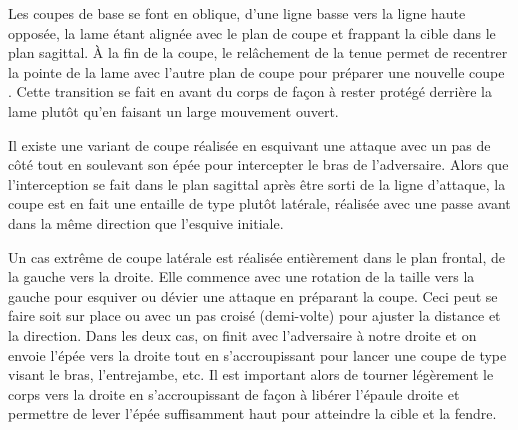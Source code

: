 Les coupes \Liao{} de base se font en oblique, d'une ligne basse vers la ligne haute opposée, la lame étant alignée avec le plan de coupe et frappant la cible dans le plan sagittal. \`{A} la fin de la coupe, le relâchement de la tenue permet de recentrer la pointe de la lame avec l'autre plan de coupe pour préparer une nouvelle coupe \Liao{}. Cette transition se fait en avant du corps de façon à rester protégé derrière la lame plutôt qu'en faisant un large mouvement ouvert.

Il existe une variant de coupe \Liao{} réalisée en esquivant une attaque avec un pas de côté tout en soulevant son épée pour intercepter le bras de l'adversaire. Alors que l'interception se fait dans le plan sagittal après être sorti de la ligne d'attaque, la coupe est en fait une entaille de type \Hua{} plutôt latérale, réalisée avec une passe avant dans la même direction que l'esquive initiale.

Un cas extrême de coupe  \Liao{} latérale est réalisée entièrement dans le plan frontal, de la gauche vers la droite. Elle commence avec une rotation de la taille vers la gauche pour esquiver ou dévier une attaque en préparant la coupe. Ceci peut se faire soit sur place ou avec un pas croisé (demi-volte) pour ajuster la distance et la direction. Dans les deux cas, on finit avec l'adversaire à notre droite et on envoie l'épée vers la droite tout en s'accroupissant pour lancer une coupe\Liao{} de type \Pi{} visant le bras, l'entrejambe, etc. Il est important alors de tourner légèrement le corps vers la droite en s’accroupissant de façon à libérer l'épaule droite et permettre de lever l'épée suffisamment haut pour atteindre la cible et la fendre.
